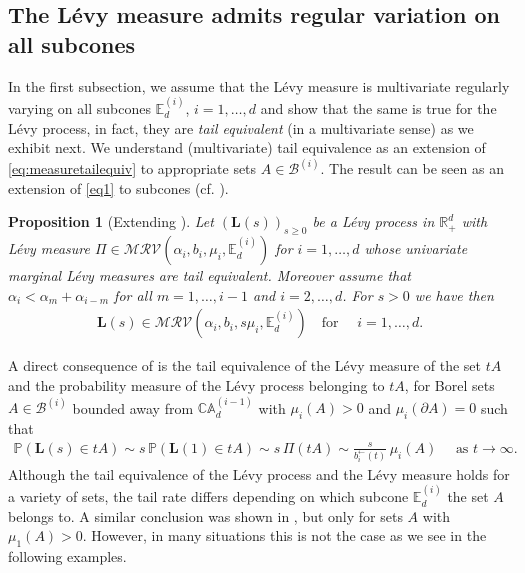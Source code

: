 \documentclass[aos]{imsart}
\numberwithin{equation}{section}
\theoremstyle{plain} %
\newtheorem{proposition}[theorem]{Proposition}
\theoremstyle{remark}
\newcommand{\beao}{\begin{eqnarray*}}
\newcommand{\eeao}{\end{eqnarray*}\noindent}
\newcommand{\E}{\mathbb{E}}
\renewcommand\P{\mathbb{P}}
\newcommand{\R}{\mathbb{R}}
\newcommand{\VF}[1]{{\color{blue} #1}}
\def\MRV{\mathcal{MRV}}
\def\bCA{\mathbb{CA}}
\def\bL{\boldsymbol L}
\begin{document}


\subsection{The L\'evy measure admits regular variation on all subcones}

In the first subsection, we  assume that the L\'evy measure is multivariate regularly  varying on all subcones $\E_d^{(i)}$, $i=1,\ldots,d$ and show that the same is true for the L\'evy process, in fact, they are \emph{tail equivalent} (in a multivariate sense) as we exhibit next. We understand (multivariate) tail equivalence as an extension of \eqref{eq:measuretailequiv} to appropriate sets $A\in \mathcal{B}^{(i)}$. The result can be seen as an extension of \eqref{eq1}  to subcones
(cf. \cite{hult:lindskog:2006b}).


\begin{proposition}[Extending ] \label{Proposition 6.1}
Let $(\bL(s))_{s\geq 0}$ be a L\'evy process in $\R_+^d$ with L\'evy measure $\Pi\in\MRV(\alpha_i,b_i,\mu_i,\E_d^{(i)})$  for $i=1,\ldots,d$ whose univariate marginal L\'evy measures are tail equivalent.
Moreover assume that $\alpha_i<\alpha_m+\alpha_{i-m}$ for all $m= 1,\ldots, i-1$ and $i = 2,\ldots,d$. For $s>0$ we have then
\beao  \bL(s)\in\MRV(\alpha_i,b_i,s\mu_i,\E_d^{(i)}) \quad  \text {for } \quad i=1,\ldots,d.
\eeao
\end{proposition}

A direct consequence of  is the tail equivalence of the L\'evy measure of the set $tA$ and the probability measure of the L\'evy process belonging to $tA$, for  Borel sets $A\in\mathcal{B}^{(i)}$ bounded away from $\bCA_d^{(i-1)}$ with $\mu_i(A)>0$ and $\mu_i(\partial A)=0$ such that
\beao
    \P(\bL(s)\in tA)\sim s\,\P(\bL(1)\in tA)\sim s\,\Pi(tA)\sim  \frac{s}{b_i^{\leftarrow}(t)}\, \mu_i(A)
    \quad \text{ as } t\to\infty.
\eeao
 Although the tail equivalence of the L\'evy process and the L\'evy measure holds for a variety of sets, the tail rate  differs depending on which subcone $\E_d^{(i)}$ the set $A$ belongs to. A similar conclusion was shown in  \cite{hult:lindskog:2006b}, but only for sets $A$ with $\mu_1(A)>0$. However, in many situations this is not the case as we see in the following examples.
\end{document}
